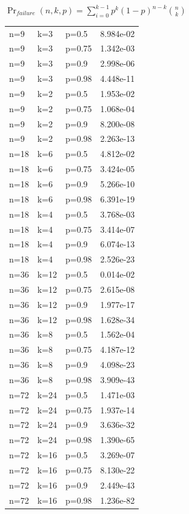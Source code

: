 \documentclass[a4paper,10pt]{article}
\begin{document}
\vspace{2cm}
{\centering
$\Pr_{failure}(n,k,p) = \displaystyle \sum_{i=0}^{k-1} p^{k}(1-p)^{n-k }{n \choose k}$
\\}
\vspace{3cm}
\begin{table}[hbt!]
\begin{center}
\begin{tabular}{llll}
n=9&  k=3&  p=0.5  &  8.984e-02 \\
n=9&  k=3&  p=0.75 & 1.342e-03\\
n=9&  k=3&  p=0.9  &  2.998e-06\\
n=9&  k=3&  p=0.98 & 4.448e-11\\
n=9&  k=2&  p=0.5  &  1.953e-02\\
n=9&  k=2&  p=0.75 & 1.068e-04\\
n=9&  k=2&  p=0.9  &  8.200e-08\\
n=9&  k=2&  p=0.98 & 2.263e-13\\
n=18& k=6&  p=0.5  & 4.812e-02\\
n=18& k=6&  p=0.75 &3.424e-05\\
n=18& k=6&  p=0.9  & 5.266e-10\\
n=18& k=6&  p=0.98 &6.391e-19\\
n=18& k=4&  p=0.5  & 3.768e-03\\
n=18& k=4&  p=0.75 &3.414e-07\\
n=18& k=4&  p=0.9  & 6.074e-13\\
n=18& k=4&  p=0.98 &2.526e-23\\
n=36& k=12& p=0.5  &0.014e-02\\
n=36& k=12& p=0.75&2.615e-08\\
n=36& k=12& p=0.9  &1.977e-17\\
n=36& k=12& p=0.98&1.628e-34\\
n=36& k=8&  p=0.5  & 1.562e-04\\
n=36& k=8&  p=0.75 &4.187e-12\\
n=36& k=8&  p=0.9  & 4.098e-23\\
n=36& k=8&  p=0.98 &3.909e-43\\
n=72& k=24& p=0.5  &1.471e-03\\
n=72& k=24& p=0.75&1.937e-14\\
n=72& k=24& p=0.9  &3.636e-32\\
n=72& k=24& p=0.98&1.390e-65\\
n=72& k=16& p=0.5  &3.269e-07\\
n=72& k=16& p=0.75&8.130e-22\\
n=72& k=16& p=0.9  &2.449e-43\\
n=72& k=16& p=0.98&1.236e-82\\
\end{tabular}
\end{center}
\end{table}
\end{document}

